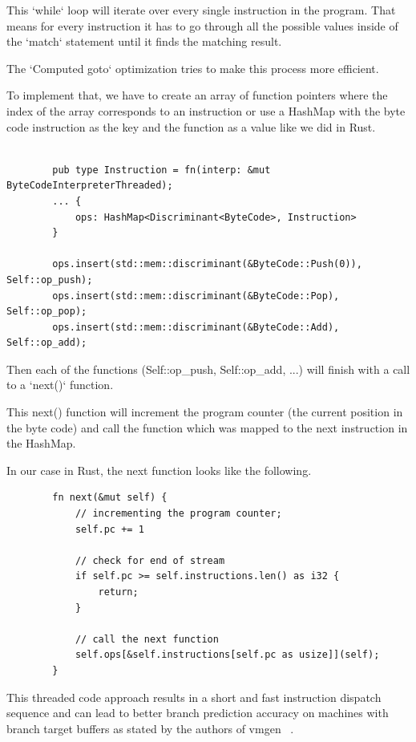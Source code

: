 \documentclass{article}
\begin{document}
\begin{enumerate}
        This `while` loop will iterate over every single instruction in the program. That means
        for every instruction it has to go through all the possible values inside of the `match`
        statement until it finds the matching result.

        The `Computed goto` optimization tries to make this process more efficient.

        To implement that, we have to create an array of function pointers where
        the index of the array corresponds to an instruction or use a HashMap
        with the byte code instruction as the key and the function as a value
        like we did in Rust.

        \begin{verbatim}

        pub type Instruction = fn(interp: &mut ByteCodeInterpreterThreaded);
        ... {
            ops: HashMap<Discriminant<ByteCode>, Instruction>
        }

        ops.insert(std::mem::discriminant(&ByteCode::Push(0)), Self::op_push);
        ops.insert(std::mem::discriminant(&ByteCode::Pop), Self::op_pop);
        ops.insert(std::mem::discriminant(&ByteCode::Add), Self::op_add);
        \end{verbatim}

        Then each of the functions (Self::op\_push, Self::op\_add, ...) will finish
        with a call to a `next()` function.

        This next() function will increment the program counter (the current
        position in the byte code) and call the function which was mapped to
        the next instruction in the HashMap.

        In our case in Rust, the next function looks like the following.

        \begin{verbatim}
        fn next(&mut self) {
            // incrementing the program counter;
            self.pc += 1 

            // check for end of stream
            if self.pc >= self.instructions.len() as i32 {
                return; 
            }

            // call the next function
            self.ops[&self.instructions[self.pc as usize]](self);
        }
        \end{verbatim}

        This threaded code approach results in a short and fast instruction
        dispatch sequence and can lead to better branch prediction accuracy on
        machines with branch target buffers as stated by the authors of vmgen ~\cite{vmgen}.

\end{enumerate}
\end{document}
